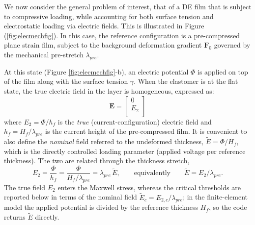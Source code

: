 \documentclass[final,3p,times]{elsarticle}
\begin{document}
We now consider the general problem of interest, that of a DE film that is subject to compressive loading, while accounting for both surface tension and electrostatic loading via electric fields. This is illustrated in Figure (\ref{fig:elecmechfig}). In this case, the reference configuration is a pre-compressed plane strain film, subject to the background deformation gradient $\mathbf{F}_0$ governed by the mechanical pre-stretch $\lambda_{pre}$.

At this state (Figure \ref{fig:elecmechfig}-b), an electric potential $\Phi$ is applied on top of the film along with the surface tension $\gamma$. When the elastomer is at the flat state, the true electric field in the layer is homogeneous, expressed as:
\begin{equation}
	\mathbf{E}=\begin{bmatrix}
	0 \\
	E_2 \\
\end{bmatrix}	
	\label{eq:elecfield} 
\end{equation}
where $E_2=\Phi/h_f$ is the \emph{true} (current-configuration) electric field and $h_f=H_f/\lambda_{pre}$ is the current height of the pre-compressed film. It is convenient to also define the \emph{nominal} field referred to the undeformed thickness, $\tilde E=\Phi/H_f$, which is the directly controlled loading parameter (applied voltage per reference thickness). The two are related through the thickness stretch,
\begin{equation}
	E_2=\frac{\Phi}{h_f}=\frac{\Phi}{H_f/\lambda_{pre}}=\lambda_{pre}\,\tilde E,
	\qquad\text{equivalently}\qquad \tilde E=E_2/\lambda_{pre}.
	\label{eq:Enominal}
\end{equation}
The true field $E_2$ enters the Maxwell stress, whereas the critical thresholds are reported below in terms of the nominal field $\tilde E_c=E_{2,c}/\lambda_{pre}$; in the finite-element model the applied potential is divided by the reference thickness $H_f$, so the code returns $\tilde E$ directly.
\end{document}
